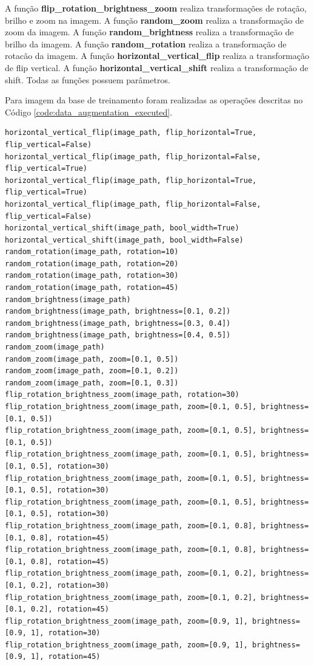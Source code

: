 \documentclass[12pt]{article}
\begin{document}
A função \textbf{flip\_rotation\_brightness\_zoom} realiza transformações de rotação, brilho e zoom na imagem. A função \textbf{random\_zoom} realiza a transformação de zoom da imagem. A função \textbf{random\_brightness} realiza a transformação de brilho da imagem. A função \textbf{random\_rotation} realiza a transformação de rotacão da imagem. A função \textbf{horizontal\_vertical\_flip} realiza a transformação de flip vertical. A função \textbf{horizontal\_vertical\_shift} realiza a transformação de shift. Todas as funções possuem parâmetros.

Para imagem da base de treinamento foram realizadas as operações descritas no Código \ref{code:data_augmentation_executed}.

\newpage

\begin{lstlisting}[caption={Funções de Augmentation Executadas},captionpos=b,frame=single,label={code:data_augmentation_executed}]
horizontal_vertical_flip(image_path, flip_horizontal=True, flip_vertical=False)
horizontal_vertical_flip(image_path, flip_horizontal=False, flip_vertical=True)
horizontal_vertical_flip(image_path, flip_horizontal=True, flip_vertical=True)
horizontal_vertical_flip(image_path, flip_horizontal=False, flip_vertical=False)
horizontal_vertical_shift(image_path, bool_width=True)
horizontal_vertical_shift(image_path, bool_width=False)
random_rotation(image_path, rotation=10)
random_rotation(image_path, rotation=20)
random_rotation(image_path, rotation=30)
random_rotation(image_path, rotation=45)
random_brightness(image_path)
random_brightness(image_path, brightness=[0.1, 0.2])
random_brightness(image_path, brightness=[0.3, 0.4])
random_brightness(image_path, brightness=[0.4, 0.5])
random_zoom(image_path)
random_zoom(image_path, zoom=[0.1, 0.5])
random_zoom(image_path, zoom=[0.1, 0.2])
random_zoom(image_path, zoom=[0.1, 0.3])
flip_rotation_brightness_zoom(image_path, rotation=30)
flip_rotation_brightness_zoom(image_path, zoom=[0.1, 0.5], brightness=[0.1, 0.5])
flip_rotation_brightness_zoom(image_path, zoom=[0.1, 0.5], brightness=[0.1, 0.5])
flip_rotation_brightness_zoom(image_path, zoom=[0.1, 0.5], brightness=[0.1, 0.5], rotation=30)
flip_rotation_brightness_zoom(image_path, zoom=[0.1, 0.5], brightness=[0.1, 0.5], rotation=30)
flip_rotation_brightness_zoom(image_path, zoom=[0.1, 0.5], brightness=[0.1, 0.5], rotation=30)
flip_rotation_brightness_zoom(image_path, zoom=[0.1, 0.8], brightness=[0.1, 0.8], rotation=45)
flip_rotation_brightness_zoom(image_path, zoom=[0.1, 0.8], brightness=[0.1, 0.8], rotation=45)
flip_rotation_brightness_zoom(image_path, zoom=[0.1, 0.2], brightness=[0.1, 0.2], rotation=30)
flip_rotation_brightness_zoom(image_path, zoom=[0.1, 0.2], brightness=[0.1, 0.2], rotation=45)
flip_rotation_brightness_zoom(image_path, zoom=[0.9, 1], brightness=[0.9, 1], rotation=30)
flip_rotation_brightness_zoom(image_path, zoom=[0.9, 1], brightness=[0.9, 1], rotation=45)
  \end{lstlisting}
\end{document}
